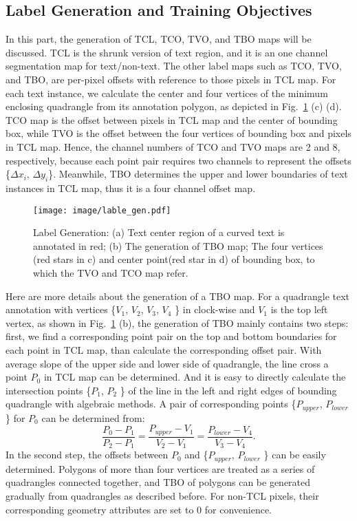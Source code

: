 \documentclass[sigconf]{acmart}
\begin{document}
\subsection{Label Generation and Training Objectives}
In this part, the generation of TCL, TCO, TVO, and TBO maps will be discussed. TCL is the shrunk version of text region, and it is an one channel segmentation map for text/non-text. 
The other label maps such as TCO, TVO, and TBO, are per-pixel offsets with reference to those pixels in TCL map. 
For each text instance, we calculate the center and four vertices of the minimum enclosing quadrangle from its annotation polygon, as depicted in Fig.~\ref{fig:label_gen} (c) (d). TCO map is the offset between pixels in TCL map and the center of bounding box, while TVO is the offset between the four vertices of bounding box and pixels in TCL map. 
Hence, the channel numbers of TCO and TVO maps are 2 and 8, respectively, because each point pair requires two channels to represent the offsets \{$\Delta x_i$, $\Delta y_i$\}.
Meanwhile, TBO determines the upper and lower boundaries of text instances in TCL map, thus it is a four channel offset map.


\begin{figure}
  \texttt{[image: image/lable\_gen.pdf]}
  \caption{Label Generation: (a) Text center region of a curved text is annotated in red; (b) The generation of TBO map; The four vertices (red stars in c) and center point(red star in d) of bounding box, to which the TVO and TCO map refer.  }
  \label{fig:label_gen}
\end{figure}


Here are more details about the generation of a TBO map. For a quadrangle text annotation with vertices \{$V_1$, $V_2$, $V_3$, $V_4$ \} in clock-wise and $V_1$ is the top left vertex, as shown in Fig.~\ref{fig:label_gen} (b), the generation of TBO mainly contains two steps: first, we find a corresponding point pair on the top and bottom boundaries for each point in TCL map, than calculate the corresponding offset pair. With average slope of the upper side and lower side of quadrangle, the line cross a point $P_0$  in TCL map can be determined. And it is easy to directly calculate the intersection points \{$P_1$, $P_2$ \} of the line in the left and right edges of bounding quadrangle with algebraic methods. A pair of corresponding points \{$P_{upper}$, $P_{lower}$ \} for $P_0$ can be determined from: 
$$ \frac{P_0 - P_1}{P_2 - P_1} = \frac{P_{upper} - V_1 }{V_2 - V_1} = \frac{P_{lower} - V_4}{V_3 - V_4}. $$ 
In the second step, the offsets between $P_0$ and \{$P_{upper}$, $P_{lower}$ \} can be easily determined. Polygons of more than four vertices are treated as a series of quadrangles connected together, and TBO of polygons can be generated gradually from quadrangles as described before. For non-TCL pixels, their corresponding geometry attributes are set to 0 for convenience.
\end{document}
